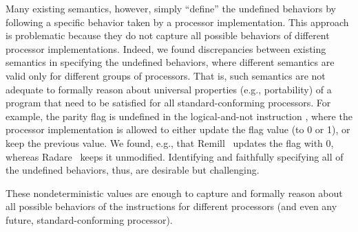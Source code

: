 Many existing semantics, however, simply ``define'' the undefined behaviors by
following a specific behavior taken by a processor implementation.
This approach is problematic because they do not capture all possible behaviors of different processor implementations.
Indeed, we found discrepancies between existing semantics in specifying the undefined behaviors, where different semantics are valid only for different groups of processors.
That is, such semantics are not adequate to formally reason about universal properties (e.g., portability) of a program that need to be satisfied for all standard-conforming processors.
%
For example, the parity flag  is undefined in the logical-and-not instruction , where the processor implementation is allowed to either update the flag value (to 0 or 1), or keep the previous value.
We found, e.g., that Remill~\cite{Remill} updates the flag with 0, whereas Radare~\cite{Radare2} keeps it unmodified.
%
Identifying and faithfully specifying all of the undefined behaviors, thus, are desirable but challenging.

These nondeterministic values are enough to capture and formally reason about all possible behaviors of the instructions for different processors (and even any future, standard-conforming processor).










%









